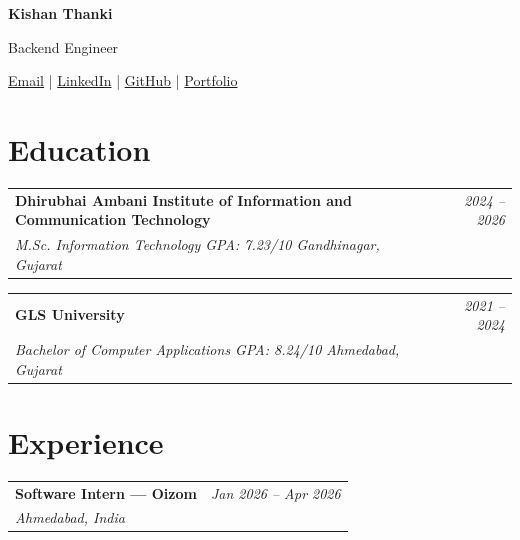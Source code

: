 \documentclass[10pt,a4paper]{article}
\makeatletter
\newcommand{\bulletsep}{\hspace{0.35em}\textbullet\hspace{0.35em}}
\newcommand{\datedentrywithsub}[3]{%
    \noindent
    \begin{tabular*}{\linewidth}{@{}l@{\extracolsep{\fill}}r@{}}
        \textbf{#1} & \textit{\color{textgray}#2} \\
        {\itshape\color{textgray}\fontsize{10}{12}\selectfont #3} & \\[-1.5pt]
    \end{tabular*}%
}
\makeatother
\begin{document}
\fontsize{10}{12.4}\selectfont

\begin{center}
    {\fontsize{25}{29}\selectfont
    \bfseries\color{accent} Kishan Thanki}
    \par\vspace{2pt}

    {\fontsize{11}{13.5}\selectfont
    \color{textgray}
    Backend Engineer}
    \par\vspace{2pt}

    {\fontsize{10.3}{12.2}\selectfont
    \href{mailto:kishanthankiat10@gmail.com}{Email}
    \quad|\quad
    \href{https://www.linkedin.com/in/kishanthanki8}{LinkedIn}
    \quad|\quad
    \href{https://github.com/kishan-thanki}{GitHub}
    \quad|\quad
    \href{https://kishan-thanki.github.io/kishanthanki/}{Portfolio}
    }
\end{center}

\section*{Education}

\datedentrywithsub
    {Dhirubhai Ambani Institute of Information and Communication Technology}
    {2024 -- 2026}
    {M.Sc. Information Technology
    \bulletsep GPA: 7.23/10
    \bulletsep Gandhinagar, Gujarat}

\vspace{3pt}

\datedentrywithsub
    {GLS University}
    {2021 -- 2024}
    {Bachelor of Computer Applications
    \bulletsep GPA: 8.24/10
    \bulletsep Ahmedabad, Gujarat}

\section*{Experience}

\datedentrywithsub
    {Software Intern --- Oizom}
    {Jan 2026 -- Apr 2026}
    {Ahmedabad, India}

\vspace{1pt}
\end{document}
